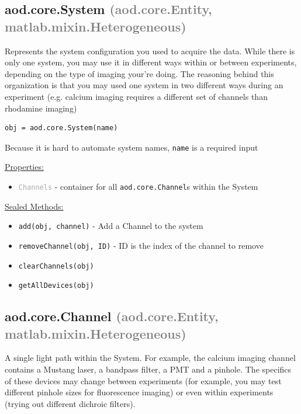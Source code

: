 \documentclass[10pt]{exam}
\newcommand\myparent[1]{\textcolor{gray}{(#1)}}
\newcommand\aodclass[1]{\textcolor{codeblue}{\texttt{#1}}}
\newcommand\aodprop[1]{\textcolor{darkgray}{\texttt{#1}}}
\newcommand\aodfcn[1]{\textcolor{darkteal}{\texttt{#1}}}
\newcommand\docheader[1]{\vspace{0.6ex}\noindent\underline{#1}\vspace{0.15ex}}
\begin{document}
	\subsection{aod.core.System \myparent{aod.core.Entity, matlab.mixin.Heterogeneous}}
		\label{subsection:SystemDoc}
		\noindent Represents the system configuration you used to acquire the data. While there is only one system, you may use it in different ways within or between experiments, depending on the type of imaging your're doing. The reasoning behind this organization is that you may used one system in two different ways during an experiment (e.g. calcium imaging requires a different set of channels than rhodamine imaging)
	
		\begin{lstlisting}[style=matlab-editor, basicstyle=\mlttfamily\footnotesize]
obj = aod.core.System(name)
		\end{lstlisting}
		\noindent Because it is hard to automate system names, \texttt{name} is a required input
		
		\docheader{Properties:}
		\begin{itemize}
			\item \aodprop{Channels} - container for all \aodclass{aod.core.Channel}s within the System
		\end{itemize}
		\docheader{Sealed Methods:}
		\begin{itemize}
			\item \aodfcn{add(obj, channel)} - Add a Channel to the system
			\item \aodfcn{removeChannel(obj, ID)} - ID is the index of the channel to remove
			\item \aodfcn{clearChannels(obj)}
			\item \aodfcn{getAllDevices(obj)}
		\end{itemize}
		
	\subsection{aod.core.Channel \myparent{aod.core.Entity, matlab.mixin.Heterogeneous}} 
		\label{subsection:ChannelDoc}
		\noindent A single light path within the System. For example, the calcium imaging channel contains a Mustang laser, a bandpass filter, a PMT and a pinhole. The specifics of these devices may change between experiments (for example, you may test different pinhole sizes for fluorescence imaging) or even within experiments (trying out different dichroic filters).
		
\end{document}
